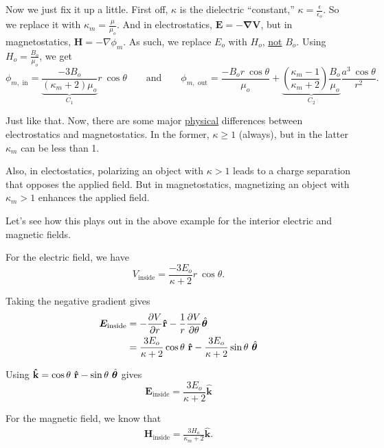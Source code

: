 \documentclass{article}
\numberwithin{equation}{section}
\newcommand{\khat}{\mathbf{\hat{k}}}
\newcommand{\rhat}{\mathbf{\hat{r}}}
\newcommand{\thetahat}{\skew{3}{\hat}{\skew{3}{}{\bm{\theta}}}}
\begin{document}
Now we just fix it up a little. First off, $\kappa$ is the dielectric ``constant,'' $\displaystyle \kappa = \frac{\epsilon}{\epsilon_o}$. So we replace it with $\kappa_m = \frac{\mu}{\mu_o}$. And in electrostatics, $\bm{E = -\nabla V}$, but in magnetostatics, $\bm{H} = -\nabla \phi_m$. As such, we replace $E_o$ with $H_o$, \underline{not} $B_o$. Using $\displaystyle H_o = \frac{B_o}{\mu_o}$, we get
\begin{equation*}
    \phi_{m, \text{ in}} = \underbrace{\frac{-3 B_o}{\left( \kappa_m + 2 \right) \mu_o}}_{C_1} r\ \cos{\theta} \qquad \text{and} \qquad \phi_{m, \text{ out}} = \frac{-B_o r\ \cos{\theta}}{\mu_o} + \underbrace{\left( \frac{\kappa_{m} - 1}{\kappa_m + 2} \right) \frac{B_o}{\mu_o}}_{C_2} \frac{a^3\ \cos{\theta}}{r^2}.
\end{equation*}

Just like that. Now, there are some major \underline{physical} differences between electrostatics and magnetostatics. In the former, $\kappa \geqslant 1$ (always), but in the latter $\kappa_m$ can be less than 1.

Also, in electostatics, polarizing an object with $\kappa > 1$ leads to a charge separation that opposes the applied field. But in magnetostatics, magnetizing an object with $\kappa_m > 1$ enhances the applied field.

Let's see how this plays out in the above example for the interior electric and magnetic fields.

For the electric field, we have
\begin{equation*}
    V_{\text{inside}} = \frac{-3 E_o}{\kappa + 2} r\ \cos{\theta}.
\end{equation*}

Taking the negative gradient gives
\begin{align*}
    \bm{E}_{\text{inside}} &= -\frac{\partial V}{\partial r} \rhat - \frac{1}{r} \frac{\partial V}{\partial \theta} \thetahat \\
    &= \frac{3 E_o}{\kappa + 2} \cos{\theta}\ \rhat - \frac{3 E_o}{\kappa + 2} \sin{\theta}\ \thetahat
\end{align*}

Using $\khat = \cos{\theta}\ \rhat - \sin{\theta}\ \thetahat$ gives
\begin{equation*}
    \boxed{\bm{E}_{\text{inside}} = \frac{3 E_o}{\kappa + 2} \khat}
\end{equation*}

For the magnetic field, we know that
\begin{gather*}
    \bm{H}_{\text{inside}} = \frac{3 H_o}{\kappa_m + 2} \khat.
\end{gather*}
\end{document}
